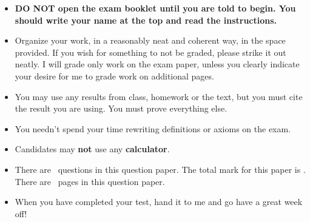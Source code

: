 \documentclass[11pt]{exam}
\begin{document}
\begin{minipage}[t]{3.7in}
\vspace{0pt}
\begin{itemize}

\item \textbf{DO NOT open the exam booklet until you are told to begin. You should write your name at the top and read the instructions.}

\vfill

\item Organize your work, in a reasonably neat and coherent way, in
the space provided. If you wish for something to not be graded, please strike it out neatly. I will grade only work on the exam paper, unless you clearly indicate your desire for me to grade work on additional pages.

\item You may use any results from class, homework or the text, but you must cite the result you are using. You must prove everything else.

\item You needn't spend your time rewriting definitions or axioms on the exam.

\item 
Candidates may \textbf{not} use any \textbf{calculator}.

\item
There are \numquestions\ questions in this question paper. The total mark for this paper is \numpoints.
There are \numpages\ pages in this question paper. 

\item When you have completed your test, hand it to me and go have a great week off!


\end{itemize}


\end{minipage}
\hfill
\begin{minipage}[t]{2.3in}
\vspace{0pt}
\addpoints %
\gradetable[v][questions]  %

\end{minipage}
\end{document}
